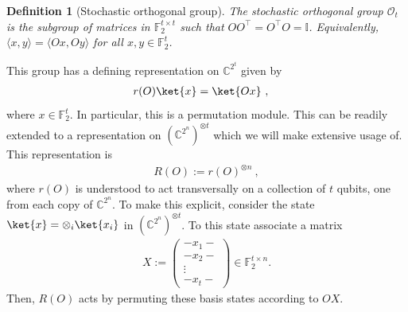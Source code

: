 \documentclass[11pt]{article}
\newtheorem{definition}[theorem]{Definition}
\newcommand{\id}{\ensuremath{\mathbb{I}}}
\newcommand{\F}{\mathbb{F}}
\newcommand{\Oc}{\mathcal{O}}
\begin{document}
\begin{definition}[Stochastic orthogonal group]
    The stochastic orthogonal group $\Oc_t$ is the subgroup of matrices in $\F_2^{t \times t}$ such that $OO^\top = O^\top O = \id$. Equivalently, $\langle x, y\rangle = \langle Ox, Oy\rangle$ for all $x,y \in \F_2^t$.
\end{definition}

This group has a defining representation on $\mathbb{C}^{2^t}$ given by
\begin{align}
    r(O)\ket{x} & = \ket{Ox}\ ,
\end{align}
where $x\in \F_2^{t}$. In particular, this is a permutation module. This can be readily extended to a representation on $(\mathbb{C}^{2^n})^{\otimes t}$ which we will make extensive usage of. This representation is
\begin{align}
    R(O) := r(O)^{\otimes n}\ ,
\end{align}
where $r(O)$ is understood to act transversally on a collection of $t$ qubits, one from each copy of $\mathbb{C}^{2^n}$. To make this explicit, consider the state $\ket{x} = \otimes_i \ket{x_i}$ in $(\mathbb{C}^{2^n})^{\otimes t}$. To this state associate a matrix
\begin{align}
  X := \begin{pmatrix}
        -x_1 -\\
        -x_2-\\
        \vdots\\
        -x_t-
    \end{pmatrix}\in \F_2^{t \times n} .
\end{align}
Then, $R(O)$ acts by permuting these basis states according to $OX$.
\end{document}
